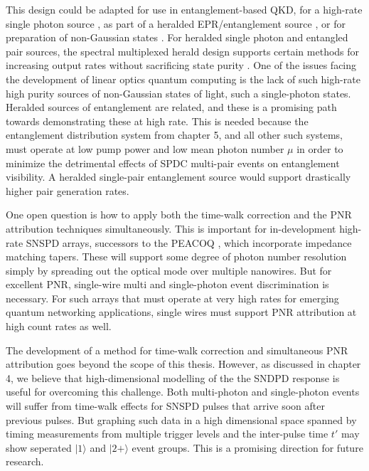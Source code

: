 \documentclass[11pt]{caltech_thesis} %
\begin{document}
This design could be adapted for use in entanglement-based QKD, for a high-rate single photon source \autocite{MeyerScott2020Single,MeyerScott2017,Andreas:12}, as part of a heralded EPR/entanglement source \autocite{barz2010heralded,barz2010heralded}, or for preparation of non-Gaussian states \autocite{Walschaers2021,AsavanantBook,Walschaers2021}. For heralded single photon and entangled pair sources, the spectral multiplexed herald design supports certain methods for increasing output rates without sacrificing state purity \autocite[\textcite{Grimau2017Heralded}]{Hiemstra2020}. One of the issues facing the development of linear optics quantum computing is the lack of such high-rate high purity sources of non-Gaussian states of light, such a single-photon states. Heralded sources of entanglement are related, and these is a promising path towards demonstrating these at high rate. This is needed because the entanglement distribution system from chapter 5, and all other such systems, must operate at low pump power and low mean photon number $\mu$ in order to minimize the detrimental effects of SPDC multi-pair events on entanglement visibility. A heralded single-pair entanglement source would support drastically higher pair generation rates.

One open question is how to apply both the time-walk correction and the PNR attribution techniques simultaneously. This is important for in-development high-rate SNSPD arrays, successors to the PEACOQ \autocite{Craiciu23}, which incorporate impedance matching tapers. These will support some degree of photon number resolution simply by spreading out the optical mode over multiple nanowires. But for excellent PNR, single-wire multi and single-photon event discrimination is necessary. For such arrays that must operate at very high rates for emerging quantum networking applications, single wires must support PNR attribution at high count rates as well.

The development of a method for time-walk correction and simultaneous PNR attribution goes beyond the scope of this thesis. However, as discussed in chapter 4, we believe that high-dimensional modelling of the the SNDPD response is useful for overcoming this challenge. Both multi-photon and single-photon events will suffer from time-walk effects for SNSPD pulses that arrive soon after previous pulses. But graphing such data in a high dimensional space spanned by timing measurements from multiple trigger levels and the inter-pulse time $t'$ may show seperated $|1\rangle$ and $|2+\rangle$ event groups. This is a promising direction for future research.
\end{document}
